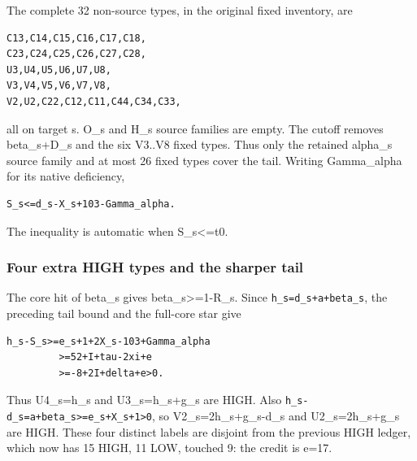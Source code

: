 \documentclass[10pt,a4paper]{article}
\theoremstyle{definition}
\begin{document}
The complete 32 non-source types,\allowbreak{} in the original fixed inventory,\allowbreak{} are

\begin{lstlisting}
C13,C14,C15,C16,C17,C18,
C23,C24,C25,C26,C27,C28,
U3,U4,U5,U6,U7,U8,
V3,V4,V5,V6,V7,V8,
V2,U2,C22,C12,C11,C44,C34,C33,
\end{lstlisting}

all on target s. O\_\allowbreak{}s and H\_\allowbreak{}s source families are empty. The cutoff
removes beta\_\allowbreak{}s+\allowbreak{}D\_\allowbreak{}s and the six V3..V8 fixed types. Thus only the
retained alpha\_\allowbreak{}s source family and at most 26 fixed types cover the
tail. Writing Gamma\_\allowbreak{}alpha for its native deficiency,\allowbreak{}

\begin{lstlisting}
S_s<=d_s-X_s+103-Gamma_alpha.
\end{lstlisting}

The inequality is automatic when S\_\allowbreak{}s\textless=\allowbreak{}t0.

\hypertarget{four-extra-high-types-and-the-sharper-tail}{%
\subsubsection{Four extra HIGH types and the sharper
tail}\label{four-extra-high-types-and-the-sharper-tail}}

The core hit of beta\_\allowbreak{}s gives beta\_\allowbreak{}s\textgreater=\allowbreak{}1-R\_\allowbreak{}s. Since
\texttt{h\_\allowbreak{}\allowbreak{}s=\allowbreak{}d\_\allowbreak{}\allowbreak{}s+\allowbreak{}a+\allowbreak{}beta\_\allowbreak{}\allowbreak{}s},\allowbreak{} the preceding tail bound
and the full-core star give

\begin{lstlisting}
h_s-S_s>=e_s+1+2X_s-103+Gamma_alpha
         >=52+I+tau-2xi+e
         >=-8+2I+delta+e>0.
\end{lstlisting}

Thus U4\_\allowbreak{}s=\allowbreak{}h\_\allowbreak{}s and U3\_\allowbreak{}s=\allowbreak{}h\_\allowbreak{}s+\allowbreak{}g\_\allowbreak{}s are HIGH. Also
\texttt{h\_\allowbreak{}\allowbreak{}s-d\_\allowbreak{}\allowbreak{}s=\allowbreak{}a+\allowbreak{}beta\_\allowbreak{}\allowbreak{}s>=\allowbreak{}e\_\allowbreak{}\allowbreak{}s+\allowbreak{}X\_\allowbreak{}\allowbreak{}s+\allowbreak{}1>0},\allowbreak{} so
V2\_\allowbreak{}s=\allowbreak{}2h\_\allowbreak{}s+\allowbreak{}g\_\allowbreak{}s-d\_\allowbreak{}s and U2\_\allowbreak{}s=\allowbreak{}2h\_\allowbreak{}s+\allowbreak{}g\_\allowbreak{}s are HIGH. These four distinct
labels are disjoint from the previous HIGH ledger,\allowbreak{} which now has 15
HIGH,\allowbreak{} 11 LOW,\allowbreak{} touched 9: the credit is e=\allowbreak{}17.
\end{document}
